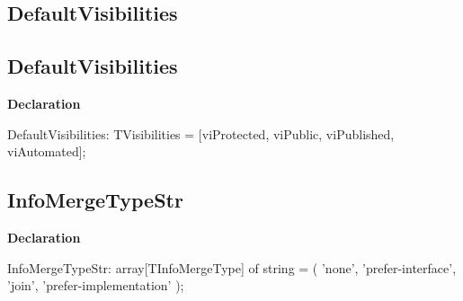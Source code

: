 \documentclass{report}
\newif\ifpdf
\begin{document}
\subsection*{\large{\textbf{DefaultVisibilities}}\normalsize\hspace{1ex}\hrulefill}
\else
\subsection*{DefaultVisibilities}
\fi
\label{PasDoc_Items-DefaultVisibilities}
\begin{list}{}{
\setlength{\itemindent}{0cm}
\setlength{\listparindent}{0cm}
\setlength{\leftmargin}{\evensidemargin}
\addtolength{\leftmargin}{\tmplength}
\settowidth{\labelsep}{X}
\addtolength{\leftmargin}{\labelsep}
\setlength{\labelwidth}{\tmplength}
}
\item[\textbf{Declaration}\hfill]
\ifpdf
\begin{flushleft}
\fi
\begin{ttfamily}
DefaultVisibilities: TVisibilities =
    [viProtected, viPublic, viPublished, viAutomated];\end{ttfamily}

\ifpdf
\end{flushleft}
\fi

\end{list}
\ifpdf
\subsection*{\large{\textbf{InfoMergeTypeStr}}\normalsize\hspace{1ex}\hrulefill}
\else
\subsection*{InfoMergeTypeStr}
\fi
\label{PasDoc_Items-InfoMergeTypeStr}
\begin{list}{}{
\setlength{\itemindent}{0cm}
\setlength{\listparindent}{0cm}
\setlength{\leftmargin}{\evensidemargin}
\addtolength{\leftmargin}{\tmplength}
\settowidth{\labelsep}{X}
\addtolength{\leftmargin}{\labelsep}
\setlength{\labelwidth}{\tmplength}
}
\item[\textbf{Declaration}\hfill]
\ifpdf
\begin{flushleft}
\fi
\begin{ttfamily}
InfoMergeTypeStr: array[TInfoMergeType] of string = (
    'none',
    'prefer-interface',
    'join',
    'prefer-implementation'
  );\end{ttfamily}

\ifpdf
\end{flushleft}
\fi

\end{list}
\ifpdf
\end{document}
